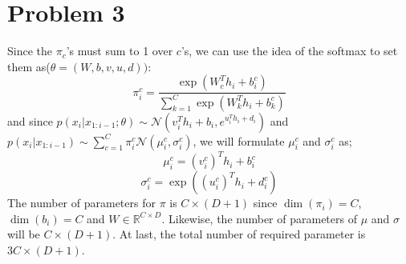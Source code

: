 \documentclass{article}
\begin{document}
\section*{Problem 3}
 Since the $\pi_c$'s must sum to 1 over $c$'s, we can use the idea of the softmax to set them as($\theta = (W,b,v,u,d))$:
\begin{equation*}
    \pi_i^c = \frac{\exp(W_c^T h_i + b_i^c  )}{\sum_{k=1}^C \exp(W_k^T h_i + b_k^c  )}
\end{equation*}
and since $p(x_i | x_{1:i-1}; \theta) \sim \mathcal{N}(v_i^T h_i + b_i, e^{u_i^T h_i + d_i})$ and $p(x_i | x_{1:i-1}) \sim \sum_{c=1}^C \pi_i^c \mathcal{N}(\mu_i^c, \sigma_i^c)$, we will formulate $\mu_i^c$ and $\sigma_i^c$ as;
\begin{equation*}
    \mu_i^c = (v_i^c)^T h_i + b_i^c 
\end{equation*}
\begin{equation*}
    \sigma_i^c = \exp((u_i^c)^T h_i + d_i^c)
\end{equation*}
The number of parameters for $\pi$ is $C \times (D+1) $ since $\dim(\pi_i)=C$, $\dim(b_i)=C$ and $W \in \mathbb{R}^{C \times D}$. Likewise, the number of parameters of $\mu$ and $\sigma$ will be $C \times (D+1)$.
At last, the total number of required parameter is $3C \times (D+1)$. 
\end{document}
